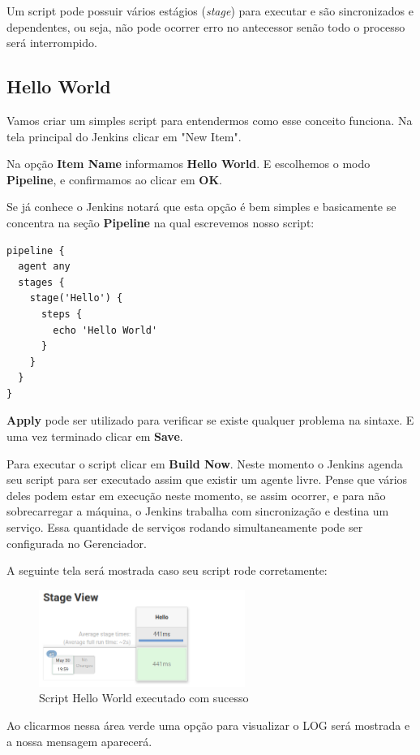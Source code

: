 \documentclass[a4paper,11pt]{article}
\begin{document}
Um script pode possuir vários estágios (\textit{stage}) para executar e são sincronizados e dependentes, ou seja, não pode ocorrer erro no antecessor senão todo o processo será interrompido.

\subsection{Hello World}
Vamos criar um simples script para entendermos como esse conceito funciona. Na tela principal do Jenkins clicar em "New Item".

Na opção \textbf{Item Name} informamos \textbf{Hello World}. E escolhemos o modo \textbf{Pipeline}, e confirmamos ao clicar em \textbf{OK}.

Se já conhece o Jenkins notará que esta opção é bem simples e basicamente se concentra na seção \textbf{Pipeline} na qual escrevemos nosso script:
\begin{lstlisting}
pipeline {
  agent any
  stages {
    stage('Hello') {
      steps {
		echo 'Hello World'
      }
    }
  }
}
\end{lstlisting}

\textbf{Apply} pode ser utilizado para verificar se existe qualquer problema na sintaxe. E uma vez terminado clicar em \textbf{Save}.

Para executar o script clicar em \textbf{Build Now}. Neste momento o Jenkins agenda seu script para ser executado assim que existir um agente livre. Pense que vários deles podem estar em execução neste momento, se assim ocorrer, e para não sobrecarregar a máquina, o Jenkins trabalha com sincronização e destina um serviço. Essa quantidade de serviços rodando simultaneamente pode ser configurada no Gerenciador.

A seguinte tela será mostrada caso seu script rode corretamente:
\begin{figure}[H]
	\centering
	\includegraphics[width=0.6\textwidth]{imagens/scriptHW.png}
	\caption{Script Hello World executado com sucesso}
\end{figure}

Ao clicarmos nessa área verde uma opção para visualizar o LOG será mostrada e a nossa mensagem aparecerá.
\end{document}
